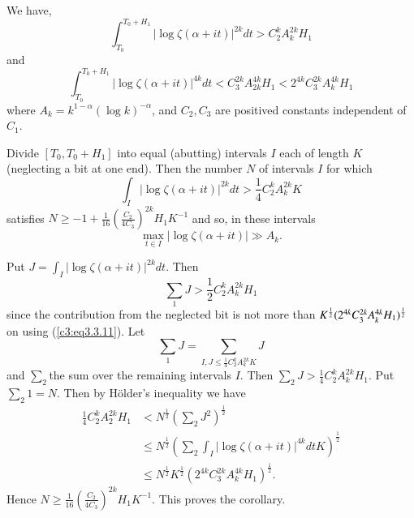 \begin{theorem}\label{c3:thm3.3.5}
We have,
\begin{equation*}
\int^{T_0 + H_1}_{T_0} |\log \zeta(\alpha + it)|^{2k} dt > C^k_2 A^{2k}_k H_1  \tag{3.3.10}\label{c3:eq3.3.10}
\end{equation*}
and
\begin{equation*}
\int^{T_0 + H_1}_{T_0} |\log \zeta(\alpha + it)|^{4k} dt < C^{2k}_3 A^{4k}_{2k} H_1 < 2^{4k} C^{2k}_3A^{4k}_k H_1  \tag{3.3.11}\label{c3:eq3.3.11}
\end{equation*}
where $A_k =k^{1-\alpha} (\log k)^{-\alpha}$, and $C_2,C_3$ are positived constants independent of $C_1$.
\end{theorem}

\begin{coro*}
Divide $[T_0, T_0 + H_1]$ into equal (abutting) intervals $I$ each of length $K$ (neglecting a bit at one end). Then the number $N$ of intervals $I$ for which 
\begin{equation*}
\int_I |\log \zeta(\alpha + it)|^{2k} dt > \frac{1}{4} C^k_2 A^{2k}_k K \tag{3.3.12}\label{c3:eq3.3.12}
\end{equation*}
satisfies $N \geq -1 + \frac{1}{16} (\frac{C_2}{4C_3})^{2k} H_1 K^{-1}$ and so, in these intervals
$$
\max\limits_{t \in I} |\log \zeta(\alpha + it)| \gg A_k.
$$
\end{coro*}

\medskip
{} Put $J = \int_I |\log \zeta(\alpha + it)|^{2k} dt$. Then
$$
\sum\limits_1 J > \frac{1}{2} C^k_2 A^{2k}_k H_1
$$
since the contribution from the neglected bit is not more than
$K^{\frac{1}{2}} (2^{4k}\break C^{2k}_3 A^{4k}_k H_1)^{\frac{1}{2}}$ on
using (\ref{c3:eq3.3.11}). Let 
$$
\sum\limits_1 J = \sum\limits_{I, J \leq \frac{1}{4} C^k_2 A^{2k}_k K} J 
$$
and $\sum_2$\pageoriginale the sum over the remaining intervals $I$. Then $\sum_2 J > \frac{1}{4} C^k_2 A^{2k}_k H_1$. Put  $\sum_2 1 =N$. Then by H\"older's inequality we have
\begin{align*}
\frac{1}{4} C^k_2 A^{2k}_2 H_1 & < N^{\frac{1}{2}} \left(\sum_2 J^2 \right)^{\frac{1}{2}}\\
& \leq N^{\frac{1}{2}} \left(\sum_2 \int_I |\log \zeta(\alpha + it)|^{4k} dt K \right)^{\frac{1}{2}}\\
& \leq N^{\frac{1}{2}} K^{\frac{1}{2}} (2^{4k} C^{2k}_3 A^{4k}_k H_1)^{\frac{1}{2}}. 
\end{align*}
Hence $N \geq \frac{1}{16} \left( \frac{C_2}{4C_3}\right)^{2k} H_1 K^{-1}$. This proves the corollary.

